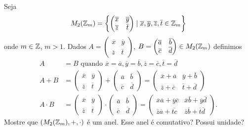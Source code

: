 \documentclass[12pt]{exam}
\begin{document}
    \questao{} Seja
    \[
        M_2(\mathbb{Z}_m) = \left\{\begin{pmatrix}
            \overline{x} & \overline{y}\\\overline{z} & \overline{t}
        \end{pmatrix} \mid \overline{x}, \overline{y}, \overline{z}, \overline{t} \in \mathbb{Z}_m \right\}
    \]
    onde $m \in \mathbb{Z}$, $m > 1$.
    Dados $A = \begin{pmatrix}
            \overline{x} & \overline{y}\\\overline{z} & \overline{t}
        \end{pmatrix}$, $B = \begin{pmatrix}
            \overline{a} & \overline{b}\\\overline{c} & \overline{d}
        \end{pmatrix} \in M_2(\mathbb{Z}_m)$ definimos
    \begin{align*}
        A &= B \mbox{ quando } \overline{x} = \overline{a}, \overline{y} = \overline{b}, \overline{z} = \overline{c}, \overline{t} = \overline{d}\\
        A + B &= \begin{pmatrix}
            \overline{x}& \overline{y}\\\overline{z} &\overline{t}
        \end{pmatrix} + \begin{pmatrix}
            \overline{a} & \overline{b}\\\overline{c} & \overline{d}
        \end{pmatrix} = \begin{pmatrix}
            \overline{x}+ \overline{a} & \overline{y} + \overline{b}\\\overline{z} + \overline{c} &\overline{t} + \overline{d}
        \end{pmatrix}\\
        A \cdot B &= \begin{pmatrix}
            \overline{x}& \overline{y}\\\overline{z} &\overline{t}
        \end{pmatrix} \cdot \begin{pmatrix}
            \overline{a} & \overline{b}\\\overline{c} & \overline{d}
        \end{pmatrix} = \begin{pmatrix}
            \overline{x}\overline{a} + \overline{y}\overline{c} & \overline{x}\overline{b} + \overline{y}\overline{d}\\\overline{z}\overline{a} + \overline{tc} & \overline{z}\overline{b} + \overline{t}\overline{d}
        \end{pmatrix}.
    \end{align*}
    Mostre que $(M_2(\mathbb{Z}_m), + , \cdot)$ \'e um anel. Esse anel \'e comutativo? Possui unidade?
\end{document}
